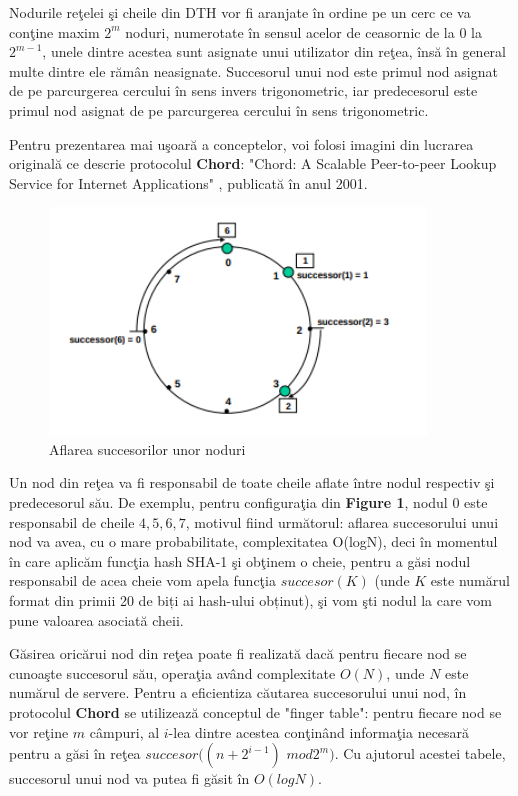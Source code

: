 \documentclass[runningheads]{llncs}
\begin{document}
Nodurile reţelei şi cheile din DTH vor fi aranjate în ordine pe un cerc ce va conţine maxim $2^{m}$ noduri, numerotate în sensul acelor de ceasornic de la $0$ la $2^{m-1}$, unele dintre acestea sunt asignate unui utilizator din reţea, însă în general multe dintre ele rămân neasignate. Succesorul unui nod este primul nod asignat de pe parcurgerea cercului în sens invers trigonometric, iar predecesorul este primul nod asignat de pe parcurgerea cercului în sens trigonometric. 

Pentru prezentarea mai uşoară a conceptelor, voi folosi imagini din lucrarea originală ce descrie protocolul \textbf{Chord}: "Chord: A Scalable Peer-to-peer Lookup Service for Internet Applications" \cite{ChordArticle}, publicată în anul 2001.

\begin{figure}[!h]
	\centering
	\includegraphics[width=10cm]{succ-pred.jpg}
	\caption{Aflarea succesorilor unor noduri}
\end{figure}

Un nod din reţea va fi responsabil de toate cheile aflate între nodul respectiv şi predecesorul său. De exemplu, pentru configuraţia din \textbf{Figure 1}, nodul 0 este responsabil de cheile ${4, 5, 6, 7}$, motivul fiind următorul: aflarea succesorului unui nod va avea, cu o mare probabilitate, complexitatea O(logN), deci în momentul în care aplicăm funcţia hash SHA-1 şi obţinem o cheie, pentru a găsi nodul responsabil de acea cheie vom apela funcţia $succesor(K)$ (unde $K$ este numărul format din primii 20 de biți ai hash-ului obținut), şi vom şti nodul la care vom pune valoarea asociată cheii.

Găsirea oricărui nod din reţea poate fi realizată dacă pentru fiecare nod se cunoaşte succesorul său, operaţia având complexitate $O(N)$, unde $N$ este numărul de servere. Pentru a eficientiza căutarea succesorului unui nod, în protocolul \textbf{Chord} se utilizează conceptul de "finger table": pentru fiecare nod se vor reţine $m$ câmpuri, al $i$-lea dintre acestea conţinând informaţia necesară pentru a găsi în reţea $succesor((n+2^{i-1})$ $mod 2^m)$. Cu ajutorul acestei tabele, succesorul unui nod va putea fi găsit în $O(logN)$.
\end{document}
